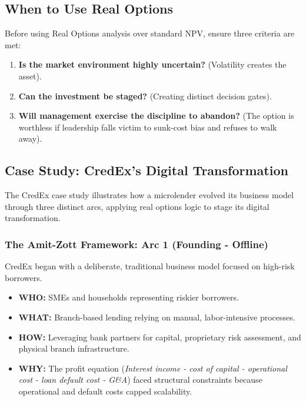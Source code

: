 \subsection{When to Use Real Options}
Before using Real Options analysis over standard NPV, ensure three criteria are
met:
\begin{enumerate}
    \item \textbf{Is the market environment highly uncertain?} (Volatility creates the asset).
    \item \textbf{Can the investment be staged?} (Creating distinct decision gates).
    \item \textbf{Will management exercise the discipline to abandon?} (The option is worthless
          if leadership falls victim to sunk-cost bias and refuses to walk away).
\end{enumerate}

\subsection{Case Study: CredEx's Digital Transformation}

The CredEx case study illustrates how a microlender evolved its business model
through three distinct arcs, applying real options logic to stage its digital
transformation.

\subsubsection{The Amit-Zott Framework: Arc 1 (Founding - Offline)}
CredEx began with a deliberate, traditional business model focused on high-risk
borrowers.
\begin{itemize}
    \item \textbf{WHO:} SMEs and households representing riskier borrowers.
    \item \textbf{WHAT:} Branch-based lending relying on manual, labor-intensive processes.
    \item \textbf{HOW:} Leveraging bank partners for capital, proprietary risk assessment, and
          physical branch infrastructure.
    \item \textbf{WHY:} The profit equation (\textit{Interest income - cost of capital - operational cost - loan default cost -
              G\&A}) faced structural constraints because operational and default costs
          capped scalability.
\end{itemize}

